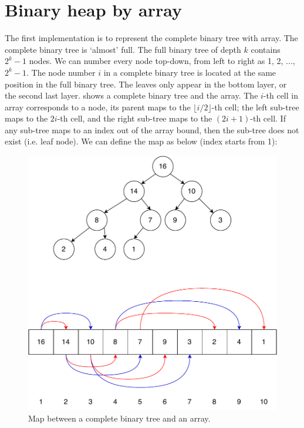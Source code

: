 \documentclass[b5paper]{article}
\begin{document}
\section{Binary heap by array}
\label{ibheap}  

The first implementation is to represent the complete binary tree with array. The complete binary tree is `almost' full. The full binary tree of depth $k$ contains $2^k - 1$ nodes. We can number every node top-down, from left to right as 1, 2, ..., $2^k -1$. The node number $i$ in a complete binary tree is located at the same position in the full binary tree. The leaves only appear in the bottom layer, or the second last layer.  shows a complete binary tree and the array. The $i$-th cell in array corresponds to a node, its parent maps to the $\lfloor i/2 \rfloor$-th cell; the left sub-tree maps to the $2i$-th cell, and the right sub-tree maps to the $(2i + 1)$-th cell. If any sub-tree maps to an index out of the array bound, then the sub-tree does not exist (i.e. leaf node). We can define the map as below (index starts from 1):

\begin{figure}[htbp]
\centering
   \includegraphics[scale=0.5]{img/binary-tree-in-array}
 \caption{Map between a complete binary tree and an array.} \label{fig:tree-array-map}
\end{figure}
\end{document}
